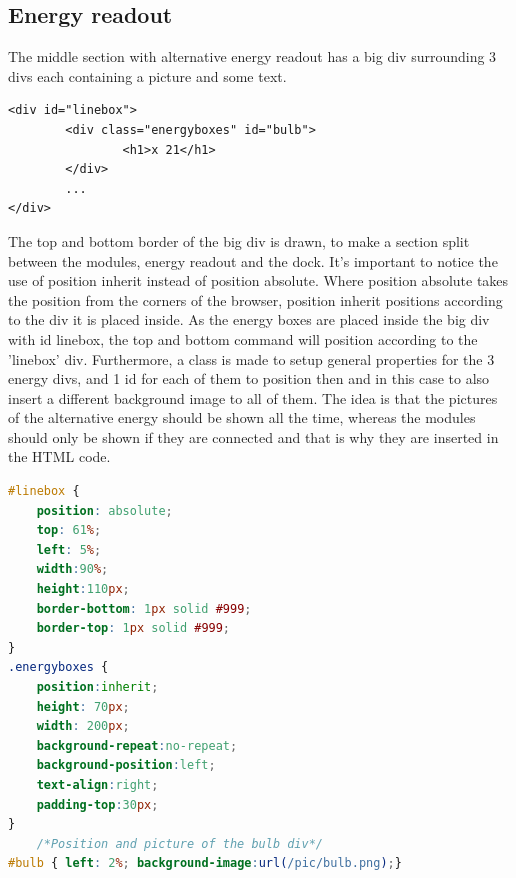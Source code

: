 \subsection{Energy readout}
The middle section with alternative energy readout has a big div surrounding 3 divs each containing a picture and some text.
\begin{lstlisting}
<div id="linebox">
		<div class="energyboxes" id="bulb">
				<h1>x 21</h1>
		</div>
		...
</div>
\end{lstlisting}
The top and bottom border of the big div is drawn, to make a section split between the modules, energy readout and the dock. It's important to notice the use of position inherit instead of position absolute. Where position absolute takes the position from the corners of the browser, position inherit positions according to the div it is placed inside. As the energy boxes are placed inside the big div with id linebox, the top and bottom command will position according to the 'linebox' div. Furthermore, a class is made to setup general properties for the 3 energy divs, and 1 id for each of them to position then and in this case to also insert a different background image to all of them. The idea is that the pictures of the alternative energy should be shown all the time, whereas the modules should only be shown if they are connected and that is why they are inserted in the HTML code.
\begin{lstlisting}[language=CSS]
#linebox {
	position: absolute;
	top: 61%;
	left: 5%;
	width:90%;
	height:110px;
	border-bottom: 1px solid #999;
	border-top: 1px solid #999;
}
.energyboxes {
	position:inherit;
	height: 70px;
	width: 200px;
	background-repeat:no-repeat;
	background-position:left;
	text-align:right;
	padding-top:30px;
}
	/*Position and picture of the bulb div*/
#bulb { left: 2%; background-image:url(/pic/bulb.png);}
\end{lstlisting}

